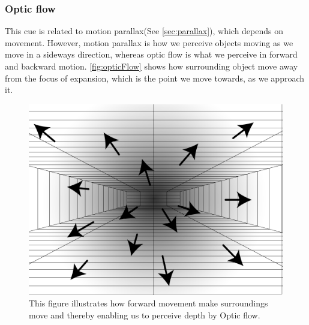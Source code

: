 \subsubsection{Optic flow}
This cue is related to motion parallax(See \autoref{sec:parallax}), which depends on movement. However, motion parallax is how we perceive objects moving as we move in a sideways direction, whereas optic flow is what we perceive in forward and backward motion. \autoref{fig:opticFlow} shows how surrounding object move away from the focus of expansion, which is the point we move towards, as we approach it.\citep[p.~205]{sensationPerception}
\begin{figure}[H]
	\centering
	\includegraphics[width=0.75\linewidth]{figure/Analysis/opticFlow.png}
	\caption{This figure illustrates how forward movement make surroundings move and thereby enabling us to perceive depth by Optic flow.}
	\label{fig:opticFlow}
\end{figure}

